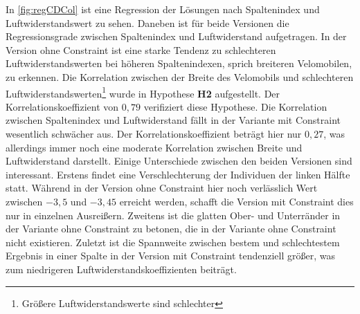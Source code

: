 In \cref{fig:regCDCol} ist eine Regression der Lösungen nach Spaltenindex und Luftwiderstandswert zu sehen.
Daneben ist für beide Versionen die Regressionsgrade zwischen Spaltenindex und Luftwiderstand aufgetragen.
In der Version ohne Constraint ist eine starke Tendenz zu schlechteren Luftwiderstandswerten bei höheren Spaltenindexen, sprich breiteren Velomobilen, zu erkennen.
Die Korrelation zwischen der Breite des Velomobils und schlechteren Luftwiderstandswerten\footnote{Größere Luftwiderstandswerte sind schlechter} wurde in Hypothese \textbf{H2} aufgestellt.
Der Korrelationskoeffizient von $0,79$ verifiziert diese Hypothese.
Die Korrelation zwischen Spaltenindex und Luftwiderstand fällt in der Variante mit Constraint wesentlich schwächer aus.
Der Korrelationskoeffizient beträgt hier nur $0,27$, was allerdings immer noch eine moderate Korrelation zwischen Breite und Luftwiderstand darstellt.
Einige Unterschiede zwischen den beiden Versionen sind interessant.
Erstens findet eine Verschlechterung der Individuen der linken Hälfte statt.
Während in der Version ohne Constraint hier noch verlässlich Wert zwischen $-3,5$ und $-3,45$ erreicht werden, schafft die Version mit Constraint dies nur in einzelnen Ausreißern.
Zweitens ist die glatten Ober- und Unterränder in der Variante ohne Constraint zu betonen, die in der Variante ohne Constraint nicht existieren.
Zuletzt ist die Spannweite zwischen bestem und schlechtestem Ergebnis in einer Spalte in der Version mit Constraint tendenziell größer, was zum niedrigeren Luftwiderstandskoeffizienten beiträgt.

